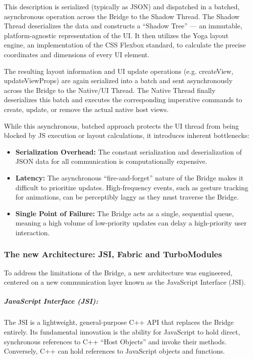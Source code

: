         This description is serialized (typically as JSON) and dispatched in a batched, asynchronous operation across the Bridge to the Shadow Thread. The Shadow Thread deserializes the data and constructs a ``Shadow Tree'' — an immutable, platform-agnostic representation of the UI. It then utilizes the Yoga layout engine, an implementation of the CSS Flexbox standard, to calculate the precise coordinates and dimensions of every UI element.
        
        The resulting layout information and UI update operations (e.g. createView, updateViewProps) are again serialized into a batch and sent asynchronously across the Bridge to the Native/UI Thread. The Native Thread finally deserializes this batch and executes the corresponding imperative commands to create, update, or remove the actual native host views.
        
        While this asynchronous, batched approach protects the UI thread from being blocked by JS execution or layout calculations, it introduces inherent bottlenecks:

        \begin{itemize}
            \item \textbf{Serialization Overhead:} The constant serialization and deserialization of JSON data for all communication is computationally expensive.
            \item \textbf{Latency:} The asynchronous ``fire-and-forget'' nature of the Bridge makes it difficult to prioritize updates. High-frequency events, such as gesture tracking for animations, can be perceptibly laggy as they must traverse the Bridge.
            \item \textbf{Single Point of Failure:} The Bridge acts as a single, sequential queue, meaning a high volume of low-priority updates can delay a high-priority user interaction.
        \end{itemize}
        
        \subsubsection{The new Architecture: JSI, Fabric and TurboModules}
        To address the limitations of the Bridge, a new architecture was engineered, centered on a new communication layer known as the JavaScript Interface (JSI).
        
            
    \subparagraph{JavaScript Interface (JSI):}
    The JSI is a lightweight, general-purpose C++ API that replaces the Bridge entirely. Its fundamental innovation is the ability for JavaScript to hold direct, synchronous references to C++ ``Host Objects'' and invoke their methods. Conversely, C++ can hold references to JavaScript objects and functions.
    
